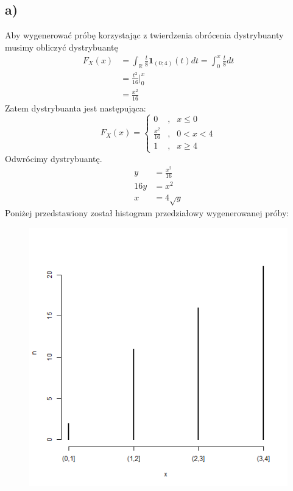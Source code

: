 \documentclass{article}
\begin{document}
\subsection{a)}
Aby wygenerować próbę korzystając z twierdzenia obrócenia dystrybuanty musimy obliczyć dystrybuantę
\begin{align*}
F_X(x) & = \int_\mathbb{R}  \frac{t}{8} \textbf{1}_{(0;4)}(t) dt = \int_0^x \frac{t}{8} dt \\
& = \frac{t^2}{16} \Big\vert_0^x \\
& = \frac{x^2}{16}
\end{align*}
Zatem dystrybuanta jest następująca:
\[ F_X(x) = \left\{ \begin{array}{lcc} 0 & , & x\leq 0 \\ \frac{x^2}{16} & , & 0<x<4 \\ 1 & , & x \geq 4 \end{array} \right. \]
Odwrócimy dystrybuantę.
\begin{align*}
y & = \frac{x^2}{16} \\
16y & = x^2 \\
x & = 4\sqrt{y}
\end{align*}
Poniżej przedstawiony został histogram przedziałowy wygenerowanej próby:
\begin{figure}[h!]
\begin{center}
\includegraphics[height = 0.4\textheight, angle = 0]{"lab7zad5.png"}
\end{center}
\end{figure}
\end{document}
